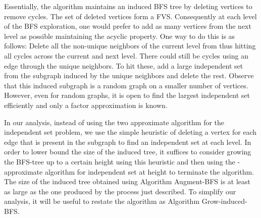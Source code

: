 \documentclass[11pt]{article}
\begin{document}
Essentially, the algorithm maintains an induced BFS tree by deleting vertices to remove cycles. The set of deleted vertices form a FVS. Consequently at each level of the BFS exploration, one would prefer to add as many vertices from the next level  as possible maintaining the acyclic property. One way to do this is as follows: Delete all the non-unique neighbors of the current level from  thus hitting all cycles across the current and next level. There could still be cycles using an edge through the unique neighbors. To hit these, add a large independent set from the subgraph induced by the unique neighbors and delete the rest. Observe that this induced subgraph is a random graph on a smaller number of vertices. However, even for random graphs, it is open to find the largest independent set efficiently and only a factor  approximation is known.

In our analysis, instead of using the two approximate algorithm for the independent set problem, we use the simple heuristic of deleting a vertex for each edge that is present in the subgraph to find an independent set at each level. In order to lower bound the size of the induced tree, it suffices to consider growing the BFS-tree up to a certain height  using this heuristic and then using the -approximate algorithm for independent set at height  to terminate the algorithm. The size of the induced tree obtained using Algorithm Augment-BFS is at least as large as the one produced by the process just described. To simplify our analysis, it will be useful to restate the algorithm as Algorithm Grow-induced-BFS.
\end{document}
